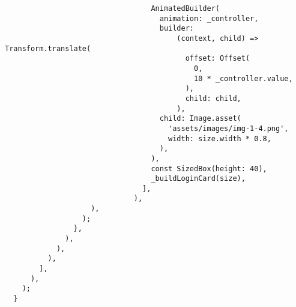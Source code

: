 \begin{verbatim}
                                  AnimatedBuilder(
                                    animation: _controller,
                                    builder:
                                        (context, child) => Transform.translate(
                                          offset: Offset(
                                            0,
                                            10 * _controller.value,
                                          ),
                                          child: child,
                                        ),
                                    child: Image.asset(
                                      'assets/images/img-1-4.png',
                                      width: size.width * 0.8,
                                    ),
                                  ),
                                  const SizedBox(height: 40),
                                  _buildLoginCard(size),
                                ],
                              ),
                    ),
                  );
                },
              ),
            ),
          ),
        ],
      ),
    );
  }


\end{verbatim}
